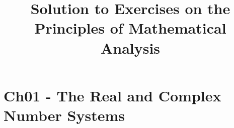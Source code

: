 \documentclass{article}
\title{Solution to Exercises on the \\Principles of Mathematical Analysis}
\begin{document}
\maketitle

\section*{Ch01 - The Real and Complex Number Systems}

\end{document}

